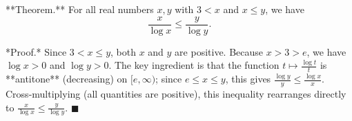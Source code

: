 **Theorem.** For all real numbers $x, y$ with $3 < x$ and $x \leq y$, we have
$$\frac{x}{\log x} \leq \frac{y}{\log y}.$$

*Proof.* Since $3 < x \leq y$, both $x$ and $y$ are positive. Because $x > 3 > e$, we have $\log x > 0$ and $\log y > 0$. The key ingredient is that the function $t \mapsto \frac{\log t}{t}$ is **antitone** (decreasing) on $[e, \infty)$; since $e \leq x \leq y$, this gives $\frac{\log y}{y} \leq \frac{\log x}{x}$. Cross-multiplying (all quantities are positive), this inequality rearranges directly to $\frac{x}{\log x} \leq \frac{y}{\log y}$. $\blacksquare$
